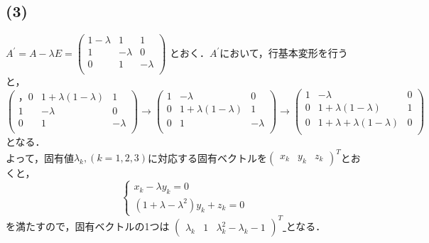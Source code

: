 \documentclass[uplatex]{jsarticle}
\begin{document}
\subsection*{(3)}
$A^\prime = A-\lambda E = 
\begin{pmatrix}
	1-\lambda & 1 & 1 \\
	1 & -\lambda & 0 \\
	0 & 1 & -\lambda \\
\end{pmatrix}
$
とおく．$A^\prime$において，行基本変形を行うと，
$
\begin{pmatrix}，
	0 & 1+\lambda(1-\lambda) & 1 \\
	1 & -\lambda & 0 \\
	0 & 1 & -\lambda \\
\end{pmatrix}
\rightarrow
\begin{pmatrix}
	1 & -\lambda & 0 \\
	0 & 1+\lambda(1-\lambda) & 1 \\
	0 & 1 & -\lambda \\
\end{pmatrix}
\rightarrow
\begin{pmatrix}
	1 & -\lambda & 0 \\
	0 & 1+\lambda(1-\lambda) & 1 \\
	0 & 1+\lambda+\lambda(1-\lambda) & 0 \\
\end{pmatrix}
$
となる．\\
よって，固有値$\lambda_k,(k=1, 2, 3)$に対応する固有ベクトルを$\begin{pmatrix}x_k & y_k & z_k\end{pmatrix}^T$とおくと，
$$
\begin{cases}
	x_k - \lambda y_k = 0 \\
	(1 + \lambda - \lambda^2)y_k + z_k = 0
\end{cases}
$$
を満たすので，固有ベクトルの1つは
\underline{
$
\begin{pmatrix}\lambda_k & 1 & \lambda_k^2-\lambda_k-1\end{pmatrix}^T
$
}
となる．
\end{document}
